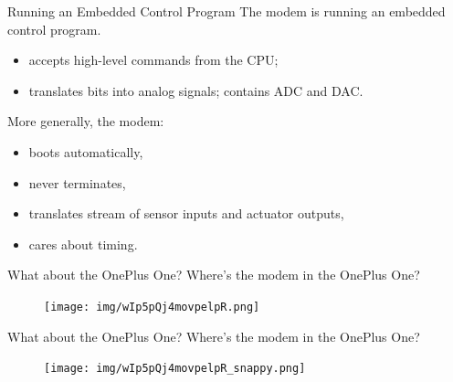 \documentclass[aspectratio=169]{beamer}
\begin{document}
\begin{frame}{Running an Embedded Control Program}
The modem is running an \alert{embedded control program}.
\begin{itemize}
\item accepts high-level commands from the CPU;
\item translates bits into analog signals; contains ADC and DAC.
\end{itemize}

\vspace{1em}More generally, the modem:
\begin{itemize}
\item boots automatically,
\item never terminates,
\item translates stream of sensor inputs and actuator outputs,
\item cares about timing.
\end{itemize}
\end{frame}



\begin{frame}{What about the OnePlus One?}
Where's the modem in the OnePlus One? \\
\begin{figure}[b]
\centering
\texttt{[image: img/wIp5pQj4movpelpR.png]}
\end{figure}
\end{frame}



\begin{frame}{What about the OnePlus One?}
Where's the modem in the OnePlus One? \\
\begin{figure}[b]
\centering
\texttt{[image: img/wIp5pQj4movpelpR\_snappy.png]}
\end{figure}
\end{frame}
\end{document}
